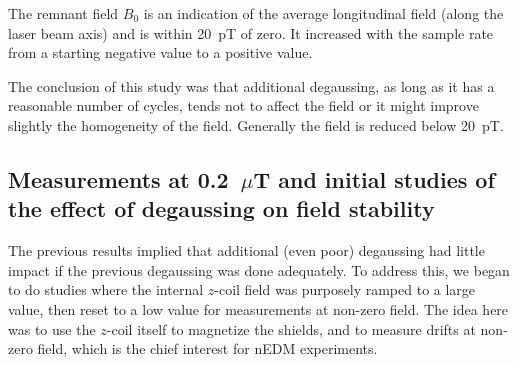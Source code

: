 The remnant field $B_0$ is an indication of the average longitudinal
field (along the laser beam axis) and is within 20~pT of zero.  It
increased with the sample rate from a starting negative value to a
positive value.

The conclusion of this study was that additional degaussing, as long
as it has a reasonable number of cycles, tends not to affect the field
or it might improve slightly the homogeneity of the field.  Generally
the field is reduced below 20~pT.



\subsection{Measurements at 0.2~$\mu$T and initial studies of the effect of degaussing on field stability\label{sec:three-degauss}}


The previous results implied that additional (even poor) degaussing
had little impact if the previous degaussing was done adequately.  To
address this, we began to do studies where the internal $z$-coil field
was purposely ramped to a large value, then reset to a low value for
measurements at non-zero field.  The idea here was to use the $z$-coil
itself to magnetize the shields, and to measure drifts at non-zero
field, which is the chief interest for nEDM experiments.


